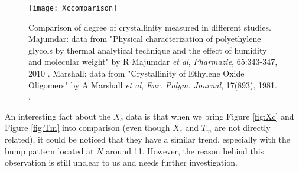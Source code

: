 \begin{figure}[H]
	\center
	\vspace{1 cm}
	\texttt{[image: Xccomparison]}
	\caption[Comparison of degree of crystallinity measured in different studies]{Comparison of degree of crystallinity measured in different studies. Majumdar: data from "Physical characterization of polyethylene glycols by thermal analytical technique and the effect of humidity and molecular weight" by R Majumdar \textit{et al}, \textit{Pharmazie}, 65:343-347, 2010 \cite{Majumdar2010}. Marshall: data from "Crystallinity of Ethylene Oxide Oligomers" by A Marshall \textit{et al}, \textit{Eur. Polym. Journal}, 17(893), 1981. \cite{Marshall1981}.}
	\label{fig:Xc comparison}
\end{figure}

An interesting fact about the $X_{c}$ data is that when we bring Figure \ref{fig:Xc} and Figure \ref{fig:Tm} into comparison (even though $X_{c}$ and $T_{m}$ are not directly related), it could be noticed that they have a similar trend, especially with the bump pattern located at $\bar{N}$ around 11. However, the reason behind this observation is still unclear to us and needs further investigation.